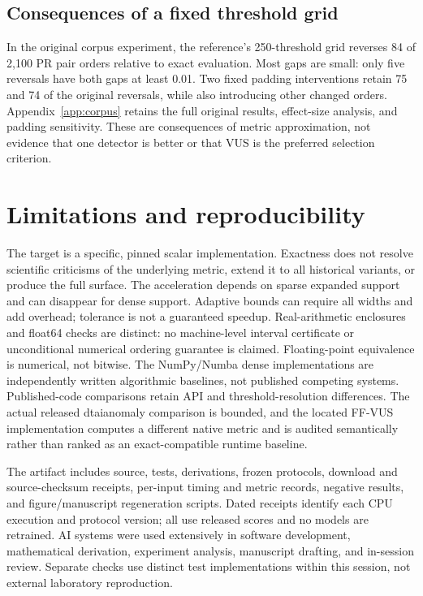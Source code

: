 \documentclass[10pt]{article}
\begin{document}
\subsection{Consequences of a fixed threshold grid}
In the original corpus experiment, the reference's 250-threshold grid
reverses 84 of 2,100 PR pair orders relative to exact evaluation. Most gaps
are small: only five reversals have both gaps at least 0.01. Two fixed
padding interventions retain 75 and 74 of the original reversals, while
also introducing other changed orders. Appendix~\ref{app:corpus} retains
the full original results, effect-size analysis, and padding sensitivity.
These are consequences of metric approximation, not evidence that one
detector is better or that VUS is the preferred selection criterion.

\section{Limitations and reproducibility}
The target is a specific, pinned scalar implementation. Exactness does not
resolve scientific criticisms of the underlying metric, extend it to all
historical variants, or produce the full surface. The acceleration depends on
sparse expanded support and can disappear for dense support. Adaptive bounds
can require all widths and add overhead; tolerance is not a guaranteed speedup.
Real-arithmetic enclosures and float64 checks are distinct: no machine-level
interval certificate or unconditional numerical ordering guarantee is claimed.
Floating-point equivalence is numerical, not bitwise. The NumPy/Numba dense implementations
are independently written algorithmic baselines, not published competing
systems. Published-code comparisons retain API and threshold-resolution
differences. The actual released dtaianomaly comparison is bounded, and the
located FF-VUS implementation computes a different native metric and is
audited semantically rather than ranked as an exact-compatible runtime baseline.

The artifact includes source, tests, derivations, frozen protocols, download
and source-checksum receipts, per-input timing and metric records, negative
results, and figure/manuscript regeneration scripts. Dated receipts identify
each CPU execution and protocol version; all use released scores and no
models are retrained. AI systems were used extensively in software
development, mathematical derivation,
experiment analysis, manuscript drafting, and in-session review.
Separate checks use distinct test implementations within this session,
not external laboratory reproduction.
\end{document}
